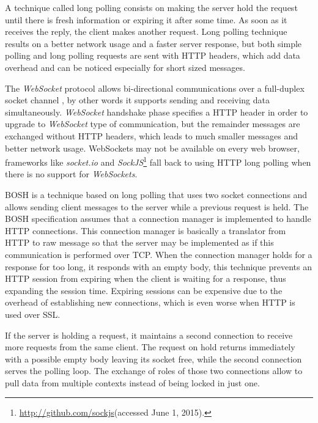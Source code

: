 A technique called long polling consists on making the server hold the request until there is fresh information or expiring it after some time.
As soon as it receives the reply, the client makes another request. Long polling technique results on a better network usage and a faster server response, but both simple polling and long polling requests are sent with \ac{HTTP} headers, which add data overhead and can be noticed especially for short sized messages.

The \emph{WebSocket} protocol allows bi-directional communications over a full-duplex socket channel \cite{rfc6455}, by other words it supports sending and receiving data simultaneously.
 \emph{WebSocket} handshake phase specifies a \ac{HTTP} header in order to upgrade to \emph{WebSocket} type of communication, but the remainder messages are exchanged without \ac{HTTP} headers, which leads to much smaller messages and better network usage. WebSockets may not be available on every web browser, frameworks like \emph{socket.io} and \emph{SockJS}\footnote{\url{http://github.com/sockjs}(accessed June 1, 2015).} fall back to using \ac{HTTP} long polling when there is no support for \emph{WebSockets}. 

  \ac{BOSH}\cite{xep0124} is a technique based on long polling that uses two socket connections and allows sending client messages to the server while a previous request is held.
  The \ac{BOSH} specification assumes that a connection manager is implemented to handle \ac{HTTP} connections. This connection manager is basically a translator from \ac{HTTP} to raw message so that the server may be implemented as if this communication is performed over \ac{TCP}.
  When the connection manager holds for a response for too long, it responds with an empty body, this technique prevents an \ac{HTTP} session from expiring when the client is waiting for a response, thus expanding the session time. Expiring sessions can be expensive due to the overhead of establishing new connections, which is even worse when \ac{HTTP} is used over \ac{SSL}.

  If the server is holding a request, it maintains a second connection to receive more requests from the same client. The request on hold returns immediately with a possible empty body leaving its socket free, while the second connection serves the polling loop. The exchange of roles of those two connections allow to pull data from multiple contexts instead of being locked in just one.

